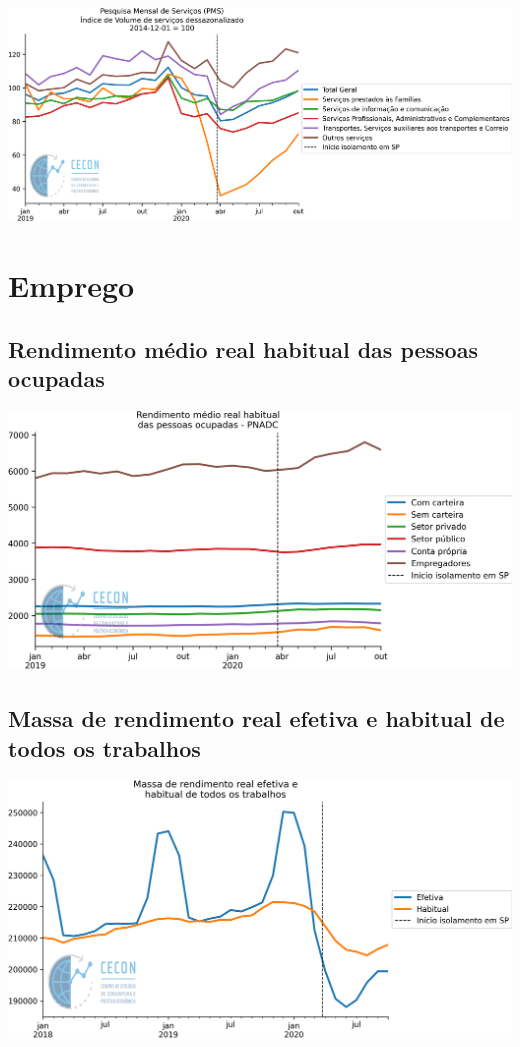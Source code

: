 \documentclass{SelfArx}
\begin{document}
\begin{center}
\includegraphics[width=.9\linewidth]{./figs/Setoriais/PMS_IBGE.png}
\end{center}

\section*{Emprego}
\label{sec:orga6e288e}

\subsection*{Rendimento médio real habitual das pessoas ocupadas}
\label{sec:org57c43d9}


\begin{center}
\includegraphics[width=.9\linewidth]{./figs/Emprego/RMHPO.png}
\end{center}

\subsection*{Massa de rendimento real efetiva e habitual de todos os trabalhos}
\label{sec:org72efb5b}

\begin{center}
\includegraphics[width=.9\linewidth]{./figs/Emprego/MRR_Efetiva_Habitual.png}
\end{center}
\end{document}
